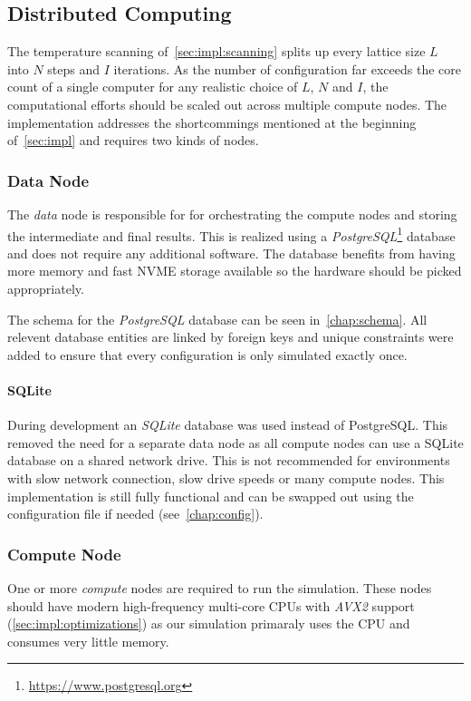 \subsection{Distributed Computing}\label{sec:impl:computing}
	The temperature scanning of~\cref{sec:impl:scanning} splits up every lattice size $L$ into $N$ steps and $I$ iterations. As the number of configuration far exceeds the core count of a single computer for any realistic choice of $L$, $N$ and $I$, the computational efforts should be scaled out across multiple compute nodes. The implementation addresses the shortcommings mentioned at the beginning of~\cref{sec:impl} and requires two kinds of nodes.
	
	\subsubsection{Data Node}\label{sec:impl:computing:data}
		The \emph{data} node is responsible for for orchestrating the compute nodes and storing the intermediate and final results. This is realized using a  \emph{PostgreSQL}\footnote{\url{https://www.postgresql.org}} database and does not require any additional software. The database benefits from having more memory and fast NVME storage available so the hardware should be picked appropriately.
		
		The schema for the \emph{PostgreSQL} database can be seen in~\cref{chap:schema}. All relevent database entities are linked by foreign keys and unique constraints were added to ensure that every configuration is only simulated exactly once.
		
		\paragraph{SQLite}
			During development an \emph{SQLite} database was used instead of PostgreSQL. This removed the need for a separate data node as all compute nodes can use a SQLite database on a shared network drive. This is not recommended for environments with slow network connection, slow drive speeds or many compute nodes.  This implementation is still fully functional and can be swapped out using the configuration file if needed (see~\cref{chap:config}).
	
	\subsubsection{Compute Node}\label{sec:impl:computing:compute}
		One or more \emph{compute} nodes are required to run the simulation. These nodes should have modern high-frequency multi-core CPUs with \emph{AVX2} support (\cref{sec:impl:optimizations}) as our simulation primaraly uses the CPU and consumes very little memory.
		
